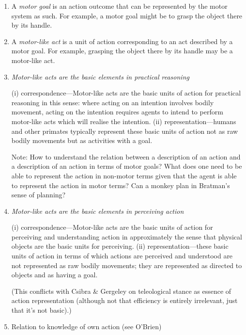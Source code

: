 \documentclass[12pt,a4paper]{extarticle}
\begin{document}
\begin{enumerate}
\item A \emph{motor goal} is an action outcome that can be represented by the motor system as such.  For example, a motor goal might be to grasp the object there by its handle.

\item A \emph{motor-like act} is a unit of action corresponding to an act described by a motor goal.  For example, grasping the object there by its handle may be a motor-like act.

\item \emph{Motor-like acts are the basic elements in practical reasoning}

(i) correspondence---Motor-like acts are the basic units of action for practical reasoning in this sense: where acting on an intention involves bodily movement, acting on the intention requires agents to intend to perform motor-like acts which will realise the intention. (ii) representation---humans and other primates typically represent these basic units of action not as raw bodily movements but as activities with a goal.

Note: How to understand the relation between a description of an action and a description of an action in terms of motor goals?
What does one need to be able to represent the action in non-motor terms given that the agent is able to represent the action in motor terms?
Can a monkey plan in Bratman's sense of planning?  

\item \emph{Motor-like acts are the basic elements in perceiving action}

(i) correspondence---Motor-like acts are the basic units of action for perceiving and understanding action in approximately the sense that physical objects are the basic units for perceiving.  (ii) representation---these basic units of action in terms of which actions are perceived and understood are not represented as raw bodily movements; they are represented as directed to objects and as having a goal.

(This conflicts with Csibra \& Gergeley on teleological stance as essence of action representation (although not that efficiency is entirely irrelevant, just that it's not basic).)


\item Relation to knowledge of own action (see O'Brien)


\end{enumerate}
\end{document}
